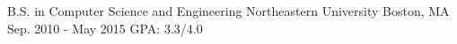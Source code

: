 
\begin{cventries}
	\cventry
	    {B.S. in Computer Science and Engineering} %
	    {Northeastern University} %
	    {Boston, MA} %
	    {Sep. 2010 - May 2015} %
	    {GPA: 3.3/4.0} %
\end{cventries}

